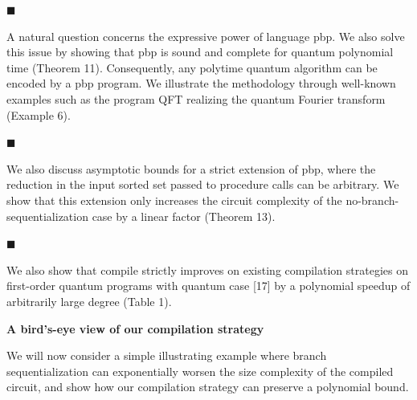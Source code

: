  
 
\par\noindent  $\blacksquare$ 
 
A natural question concerns the expressive power of language pbp. We also solve this issue by showing that pbp is sound and complete for quantum polynomial time (Theorem 11). Consequently, any polytime quantum algorithm can be encoded by a pbp program. We illustrate the methodology through well-known examples such as the program QFT realizing the quantum Fourier transform (Example 6).\par
 
 
 
\par\noindent  $\blacksquare$ 
 
We also discuss asymptotic bounds for a strict extension of pbp, where the reduction in the input sorted set passed to procedure calls can be arbitrary. We show that this extension only increases the circuit complexity of the no-branch-sequentialization case by a linear factor (Theorem 13).\par
 
 
 
\par\noindent  $\blacksquare$ 
 
We also show that compile strictly improves on existing compilation strategies on first-order quantum programs with quantum case [17] by a polynomial speedup of arbitrarily large degree (Table 1).\par
 
 
  
 
 
 
\par\medskip\noindent\textbf{A bird’s-eye view of our compilation strategy}\par
 
 
We will now consider a simple illustrating example where branch sequentialization can exponentially worsen the size complexity of the compiled circuit, and show how our compilation strategy can preserve a polynomial bound.\par
 
 

